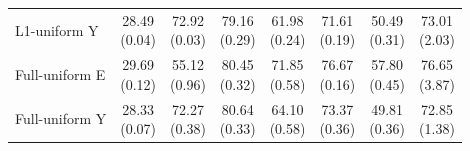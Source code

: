 \begin{table}[t]
\begin{tabular}{@{}lccccccc@{}}
L1-uniform Y & \shortstack{28.49\\{\scriptsize (0.04)}} & \shortstack{72.92\\{\scriptsize (0.03)}} & \shortstack{79.16\\{\scriptsize (0.29)}} & \shortstack{61.98\\{\scriptsize (0.24)}} & \shortstack{71.61\\{\scriptsize (0.19)}} & \shortstack{50.49\\{\scriptsize (0.31)}} & \shortstack{73.01\\{\scriptsize (2.03)}}\\
Full-uniform E & \shortstack{29.69\\{\scriptsize (0.12)}} & \shortstack{55.12\\{\scriptsize (0.96)}} & \shortstack{80.45\\{\scriptsize (0.32)}} & \shortstack{71.85\\{\scriptsize (0.58)}} & \shortstack{76.67\\{\scriptsize (0.16)}} & \shortstack{57.80\\{\scriptsize (0.45)}} & \shortstack{76.65\\{\scriptsize (3.87)}}\\
Full-uniform Y & \shortstack{28.33\\{\scriptsize (0.07)}} & \shortstack{72.27\\{\scriptsize (0.38)}} & \shortstack{80.64\\{\scriptsize (0.33)}} & \shortstack{64.10\\{\scriptsize (0.58)}} & \shortstack{73.37\\{\scriptsize (0.36)}} & \shortstack{49.81\\{\scriptsize (0.36)}} & \shortstack{72.85\\{\scriptsize (1.38)}}\\
\bottomrule\end{tabular}
\end{table}
